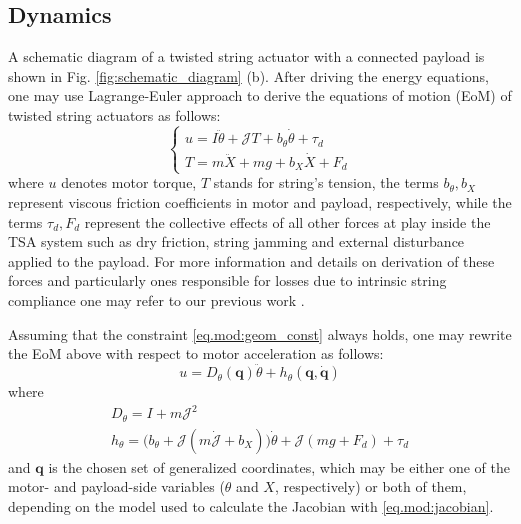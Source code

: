 \subsection{Dynamics}
A schematic diagram of a twisted string actuator with a connected payload is shown in Fig. \ref{fig:schematic_diagram} (b). After driving the energy equations, one may use Lagrange-Euler approach to derive the equations of motion (EoM) of twisted string actuators as follows:
\begin{equation}\label{eq.mod:dyn_model}
\left\{\begin{matrix}
u = I \ddot{\theta} + \mathcal{J}T  + b_\theta \dot{\theta} + \tau_{d}
\\[0.5em]
T = m \ddot{X} + mg  + b_X \dot{X} + F_{d}
\end{matrix}\right.
\end{equation}
where $u$ denotes motor torque, $T$ stands for string's tension, the terms $ b_\theta,  b_X$ represent viscous friction coefficients in motor and payload, respectively, while the terms $\tau_{d}, F_{d}$ represent the collective effects of all other forces at play inside the TSA system such as dry friction, string jamming and external disturbance applied to the payload. For more information and details on derivation of these forces and particularly ones responsible for losses due to intrinsic string compliance one may refer to our previous work \cite{nedelchev2020accurate}. 

Assuming that the constraint \eqref{eq.mod:geom_const} always holds, one may rewrite the EoM above with respect to motor acceleration as follows:
\begin{equation}\label{eq.mod:dyn_motor}
u = D_\theta (\mathbf{q}) \ddot{\theta} + h_\theta(\mathbf{q},\dot{\mathbf{q}})
\end{equation}
where
\begin{equation*}
\begin{matrix}
D_\theta = I + m \mathcal{J}^2\\
h_\theta = \big(b_\theta + \mathcal{J}(m\dot{\mathcal{J}}+b_X)\big)\dot{\theta} + \mathcal{J}(mg  + F_{d}) + \tau_d
\end{matrix}
\end{equation*}
and $\mathbf{q}$ is the chosen set of generalized coordinates, which may be either one of the motor- and payload-side variables ($\theta$ and $X$, respectively) or both of them, depending on the model used to calculate the Jacobian with \eqref{eq.mod:jacobian}. 

